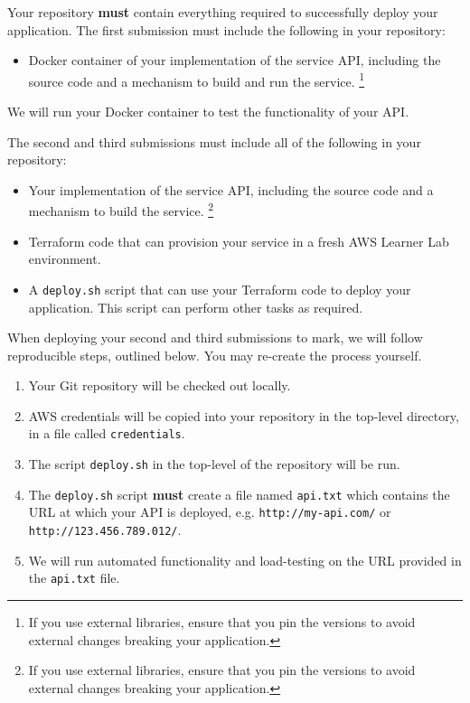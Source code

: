 \documentclass{csse4400}
\begin{document}
Your repository \textbf{must} contain everything required to successfully deploy your application.
The first submission must include the following in your repository:
\begin{itemize}
  \item Docker container of your implementation of the service API, including the source code and a mechanism to build and run the service.%
  \footnote{If you use external libraries, ensure that you pin the versions to avoid external changes breaking your application.}
\end{itemize}
We will run your Docker container to test the functionality of your API.

\begin{samepage}
\noindent
The second and third submissions must include all of the following in your repository:
\begin{itemize}
  \item Your implementation of the service API, including the source code and a mechanism to build the service.%
  \footnote{If you use external libraries, ensure that you pin the versions to avoid external changes breaking your application.}
  \item Terraform code that can provision your service in a fresh AWS Learner Lab environment.
  \item A \texttt{deploy.sh} script that can use your Terraform code to deploy your application.
    This script can perform other tasks as required.
\end{itemize}
\end{samepage}

\noindent
When deploying your second and third submissions to mark, we will follow reproducible steps, outlined below.
You may re-create the process yourself.

\begin{enumerate}
  \item Your Git repository will be checked out locally.
  \item AWS credentials will be copied into your repository in the top-level directory,
  in a file called \texttt{credentials}.
  \item The script \texttt{deploy.sh} in the top-level of the repository will be run.
  \item The \texttt{deploy.sh} script \textbf{must} create a file named \texttt{api.txt} which contains the URL at which your API is deployed, e.g. \texttt{http://my-api.com/} or \texttt{http://123.456.789.012/}.
  \item We will run automated functionality and load-testing on the URL provided in the \texttt{api.txt} file.
\end{enumerate}
\end{document}
